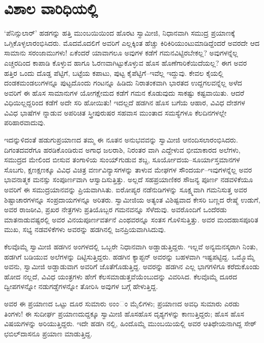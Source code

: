 
\chapter{ವಿಶಾಲ ವಾರಿಧಿಯಲ್ಲಿ}

\noindent

‘ಪೆನಿನ್ಸುಲಾರ್​’ ಹಡಗನ್ನು ಹತ್ತಿ ಮುಂಬಯಿಯಿಂದ ಹೊರಟ ಸ್ವಾಮೀಜಿ, ನಿಧಾನವಾಗಿ ಸಮುದ್ರ ಪ್ರಯಾಣಕ್ಕೆ ಒಗ್ಗಿಕೊಳ್ಳಲಾರಂಭಿಸಿದರು. ಮೊದಮೊದಲಿಗೆ ಅವರಿಗೆ ಎಲ್ಲಕ್ಕಿಂತ ಹೆಚ್ಚು ಕಿರಿಕಿರಿಯುಂಟುಮಾಡಿದ್ದೆಂದರೆ ಅವರದೇ ಆದ ಸಾಮಾನು ಸರಂಜಾಮುಗಳು! ಏಕೆಂದರೆ ಯಾವಾಗಲೂ ಅವುಗಳ ಕಡೆಗೆ ಗಮನವಿಟ್ಟಿರಬೇಕಲ್ಲ? ಅವುಗಳನ್ನೆಲ್ಲ ಎಚ್ಚರದಿಂದ ಕಾಪಾಡಿ ಕೊಳ್ಳುವ ಹಾಗೂ ಓರಣವಾಗಿಟ್ಟುಕೊಳ್ಳುವ ಹೊಸ ಹೊಣೆಗಾರಿಕೆಯಿದೆಯಲ್ಲ? ಈಗ ಅವರ ಹತ್ತಿರ ಒಂದು ದೊಡ್ಡ ಪೆಟ್ಟಿಗೆ, ಬಟ್ಟೆಯ ಕಪಾಟು, ಪುಟ್ಟ ಕೈಪೆಟ್ಟಿಗೆ–ಇವೆಲ್ಲ ಇದ್ದುವು. ಕೇವಲ ಕೈಯಲ್ಲಿ ದಂಡಕಮಂಡಲುಗಳನ್ನೂ ಪುಟ್ಟದೊಂದು ಗಂಟನ್ನೂ ಹಿಡಿದು ನಿರಾತಂಕವಾಗಿ ಭಾರತದ ಉದ್ದಗಲವನ್ನೆಲ್ಲ ಅಳೆದ ಅವರಿಗೆ ಈ ಹೊಸ ಸಾಮಾನುಗಳ ಯೋಗಕ್ಷೇಮದ ಕಡೆಗೆ ಗಮನ ಕೊಡುವುದು ಸಾಕಷ್ಟು ಕಷ್ಟವಾಯಿತು. ಆದರೆ ವಿಧಿಯಿಲ್ಲದ್ದರಿಂದ ಕಡೆಗೆ ಅದೇ ಸರಿ ಹೋಯಿತು! ಇದಲ್ಲದೆ ಹಡಗಿನ ಹೊಸ ಬಗೆಯ ಆಹಾರ, ವಿವಿಧ ದೇಶಗಳ ವಿವಿಧ ಭಾಷೆಗಳ ನ್ನಾಡುವ ಅಪರಿಚಿತ ಸ್ತ್ರೀಪುರುಷರ ಸಹವಾಸ ಮುಂತಾದ ಸಮಸ್ಯೆಗಳೂ ಕೆಲದಿನಗಳಲ್ಲೇ ಪರಿಹಾರವಾದುವು.

ಇದನ್ನುಳಿದಂತೆ ಹಡುಗುಪ್ರಯಾಣದ ತಮ್ಮ ಈ ನೂತನ ಅನುಭವವನ್ನು ಸ್ವಾಮೀಜಿ ಆನಂದಿಸಲಾರಂಭಿಸಿದರು. ದಿಗಂತದವರೆಗೂ ಹರಡಿಕೊಂಡಿರುವ ಅಗಾಧ ಜಲರಾಶಿ, ನಿರಂತರ ವಾಗಿ ಎದ್ದೇಳುವ ಭೀಮಾಕಾರದ ಅಲೆಗಳು, ಸಮುದ್ರದ ಮೇಲಿಂದ ಬೀಸುವ ತಂಗಾಳಿಯ ಸುಂಯ್​ಗುಡುವ ಶಬ್ದ, ಸೂರ್ಯೋದಯ–ಸೂರ್ಯಾಸ್ತಮಾನಗಳ ಸೊಬಗು, ಕ್ಷಣಕ್ಷಣಕ್ಕೂ ವಿವಿಧ ವಿಚಿತ್ರ ವರ್ಣವಿನ್ಯಾಸಗಳನ್ನು ತಾಳುವ ಮೇಘಗಳ ಸೌಂದರ್ಯ–ಇವುಗಳನ್ನೆಲ್ಲ ಅವರ ಭಾವನಾತ್ಮಕ ಮನಸ್ಸು ಸಂಪೂರ್ಣವಾಗಿ ಆಸ್ವಾದಿಸುತ್ತಿತ್ತು. ಅಲ್ಲದೆ ಸಹಪ್ರಯಾಣಿಕರ ಸೌಜನ್ಯ ಪೂರ್ಣ ನಡವಳಿಕೆಯೂ ಅವರಿಗೆ ಈ ಸಮುದ್ರಯಾನವನ್ನು ಪ್ರಿಯವಾಗಿಸಿತು. ಐರೋಪ್ಯರ ನಡೆನುಡಿಗಳನ್ನು ಸೂಕ್ಷ್ಮವಾಗಿ ಗಮನಿಸುತ್ತ ಅವರ ಶಿಷ್ಟಾಚಾರಗಳನ್ನೂ ಸಂಪ್ರದಾಯಗಳನ್ನೂ ಅರಿತರು. ಸ್ವಾಮೀಜಿಯ ಅತ್ಯಂತ ವಿಶಿಷ್ಟವಾದ ಕೇಸರಿ ಬಣ್ಣದ ರೇಷ್ಮೆ ಉಡುಗೆ, ಅವರ ರಾಜಠೀವಿ, ಪ್ರಖರ ನೇತ್ರಗಳು ಪ್ರತಿಯೊಬ್ಬರ ಗಮನವನ್ನೂ ಸೆಳೆದುವು. ಅವರೊಂದಿಗೆ ಒಂದೆರಡು ಮಾತನಾಡುವಷ್ಟರಲ್ಲಿ ಅವರ ವಿನಯಪೂರ್ಣವರ್ತನೆ ಎಂಥವರನ್ನೂ ಸಂತಸ ಗೊಳಿಸುತ್ತಿತ್ತು. ಅವರ ಮಂದಹಾಸಪೂರಿತ ಮುಖ, ಸಭ್ಯ ನಡವಳಿಕೆಗಳು ಅವರನ್ನು ಹಡಗಿನಲ್ಲಿ ಜನಪ್ರಿಯವಾಗಿಸಿದುವು.

ಕೆಲವೊಮ್ಮೆ ಸ್ವಾಮೀಜಿ ಹಡಗಿನ ಅಂಗಳದಲ್ಲಿ ಒಬ್ಬರೇ ನಿಧಾನವಾಗಿ ಅಡ್ಡಾಡುತ್ತಿದ್ದರು. ಇಲ್ಲವೆ ಅನ್ಯಮನಸ್ಕರಾಗಿ ನಿಂತು, ಹಡಗಿಗೆ ಬಡಿಯುವ ಅಲೆಗಳನ್ನು ದಿಟ್ಟಿಸುತ್ತಿದ್ದರು. ಹಡಗಿನ ಕ್ಯಾಪ್ಟನ್ ಅವರನ್ನು ಬಹಳವಾಗಿ ಇಷ್ಟಪಟ್ಟಿದ್ದ. ಒಮ್ಮೊಮ್ಮೆ ಅವನು, ಸ್ವಾಮೀಜಿ ಅಡ್ಡಾಡುವಾಗ ಅವರಿಗೆ ಜೊತೆಗೊಡುತ್ತಿದ್ದ. ಅವರನ್ನು ಹಡಗಿನ ಎಲ್ಲ ಭಾಗಗಳಿಗೂ ಕರೆದುಕೊಂಡು ಹೋದ ನಲ್ಲದೆ, ವಿವಿಧ ಯಂತ್ರಗಳು ಹೇಗೆ ಕೆಲಸಮಾಡುತ್ತವೆಯೆಂಬುದನ್ನು ವಿವರಿಸಿದ. ಕೆಲವೊಮ್ಮೆ ದೂರದ ದ್ವೀಪಗಳನ್ನೋ ನಡುಗಡ್ಡೆಗಳನ್ನೋ ತೋರಿಸಿ ಅವುಗಳ ಬಗ್ಗೆ ಹೇಳುತ್ತಿದ್ದ.

ಅವರ ಈ ಪ್ರಯಾಣದ ಒಟ್ಟು ದೂರ ಸುಮಾರು ೮ಂಂಂ ಮೈಲಿಗಳು; ಪ್ರಯಾಣದ ಅವಧಿ ಸುಮಾರು ಎರಡು ತಿಂಗಳು! ಈ ಸುದೀರ್ಘ ಪ್ರಯಾಣದುದ್ದಕ್ಕೂ ಸ್ವಾಮೀಜಿ ಹೊಸಹೊಸ ದೃಶ್ಯಗಳನ್ನು ಕಾಣುತ್ತಿದ್ದರು; ಹೊಸ ಹೊಸ ವಿಷಯಗಳನ್ನು ಅರಿಯುತ್ತಿದ್ದರು. ಇದೇ ಹಡಗಿ ನಲ್ಲಿ, ಹಿಂದೊಮ್ಮೆ ಮುಂಬಯಿಯಲ್ಲಿ ಅವರ ಆತಿಥೇಯನಾಗಿದ್ದ ಸೇಠ್ ಛಬಿಲ್​ದಾಸನೂ ಪ್ರಯಾಣ ಮಾಡುತ್ತಿದ್ದ.

